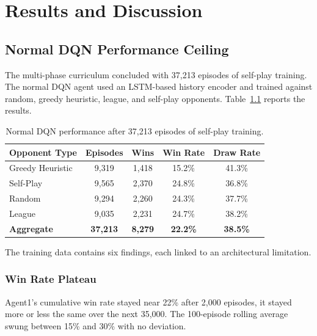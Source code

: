 \chapter{Results and Discussion}

\section{Normal DQN Performance Ceiling}

The multi-phase curriculum concluded with 37,213 episodes of self-play training. The normal DQN agent used an LSTM-based history encoder and trained against random, greedy heuristic, league, and self-play opponents. Table~\ref{tab:vanilla_performance} reports the results.

\begin{table}[htbp]
    \centering
    \caption{Normal DQN performance after 37,213 episodes of self-play training.}
    \label{tab:vanilla_performance}
    \begin{tabular}{|l|c|c|c|c|}
        \hline
        \textbf{Opponent Type} & \textbf{Episodes} & \textbf{Wins} & \textbf{Win Rate} & \textbf{Draw Rate} \\
        \hline
        Greedy Heuristic & 9,319 & 1,418 & 15.2\% & 41.3\% \\
        Self-Play        & 9,565 & 2,370 & 24.8\% & 36.8\% \\
        Random           & 9,294 & 2,260 & 24.3\% & 37.7\% \\
        League           & 9,035 & 2,231 & 24.7\% & 38.2\% \\
        \hline
        \textbf{Aggregate} & \textbf{37,213} & \textbf{8,279} & \textbf{22.2\%} & \textbf{38.5\%} \\
        \hline
    \end{tabular}
\end{table}

The training data contains six findings, each linked to an architectural limitation.

\subsection{Win Rate Plateau}\label{finding:1}
Agent1's cumulative win rate stayed near 22\% after 2,000 episodes, it stayed more or less the same over the next 35,000. The 100-episode rolling average swung between 15\% and 30\% with no deviation.

